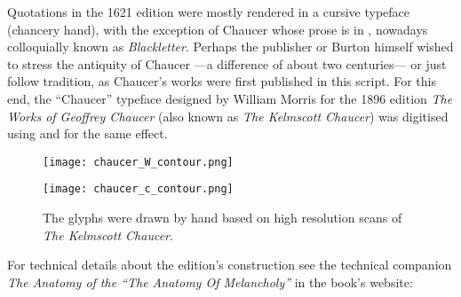 Quotations in the 1621 edition were mostly rendered in a cursive typeface (chancery hand), with the exception of Chaucer whose prose is in , nowadays colloquially known as \emph{Blackletter}. Perhaps the publisher or Burton himself wished to stress the antiquity of Chaucer ---a difference of about two centuries--- or just follow tradition, as Chaucer's works were first published in this script. For this end, the \enquote{Chaucer} typeface designed by William Morris for the 1896 edition \emph{The Works of Geoffrey Chaucer} (also known as \emph{The Kelmscott Chaucer}) was digitised using \href{https://inkscape.org/}{} and \href{https://fontforge.org/en-US/}{} for the same effect.

%
\begin{figure}[H]%
  \centering
  \begin{minipage}{0.5\textwidth}%
    \texttt{[image: chaucer\_W\_contour.png]}%
  \end{minipage}%
  \qquad{}\begin{minipage}{0.22\textwidth}%
    \texttt{[image: chaucer\_c\_contour.png]}
  \end{minipage}%
  \caption*{\scriptsize{}The glyphs were drawn by hand based on high resolution scans of \emph{The Kelmscott Chaucer}.}
\end{figure}
For technical details about the edition's construction see the technical companion \emph{The Anatomy of the \enquote{The Anatomy Of Melancholy}} in the book's website:

\vspace{\baselineskip}

\clearpage{}%
\thispagestyle{empty}%
\vspace*{\fill}%
\begin{quote}%
\centering%
{\huge{}}
\end{quote}%
\vspace*{\fill}%
